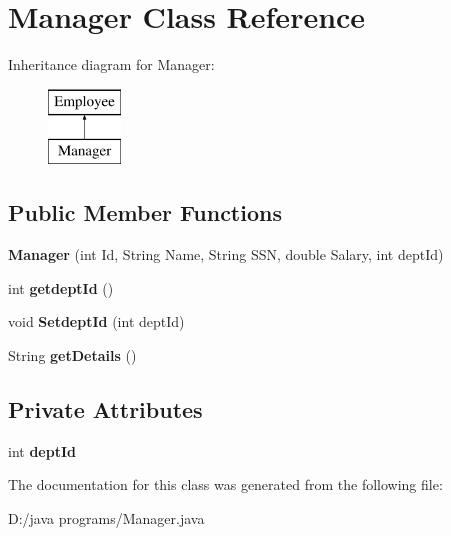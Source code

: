\hypertarget{class_manager}{}\section{Manager Class Reference}
\label{class_manager}
Inheritance diagram for Manager\+:\begin{figure}[H]
\begin{center}
\leavevmode
\includegraphics[height=2.000000cm]{class_manager}
\end{center}
\end{figure}
\subsection*{Public Member Functions}
\begin{DoxyCompactItemize}
\item 
\mbox{\label{class_manager_a061f909b2f03578f21ab391b28ee262d}} 
{\bfseries Manager} (int Id, String Name, String S\+SN, double Salary, int dept\+Id)
\item 
\mbox{\label{class_manager_abf13f4955932ce7ea13b28b2a38efe62}} 
int {\bfseries getdept\+Id} ()
\item 
\mbox{\label{class_manager_a9cdd27d5e2110ca11952b3baf169d6ad}} 
void {\bfseries Setdept\+Id} (int dept\+Id)
\item 
\mbox{\label{class_manager_aa71d277c1567908ae41f6d592e54ca3e}} 
String {\bfseries get\+Details} ()
\end{DoxyCompactItemize}
\subsection*{Private Attributes}
\begin{DoxyCompactItemize}
\item 
\mbox{\label{class_manager_aa35f96af8fba27d94e70e4bd7e3daa89}} 
int {\bfseries dept\+Id}
\end{DoxyCompactItemize}


The documentation for this class was generated from the following file\+:\begin{DoxyCompactItemize}
\item 
D\+:/java programs/Manager.\+java\end{DoxyCompactItemize}
